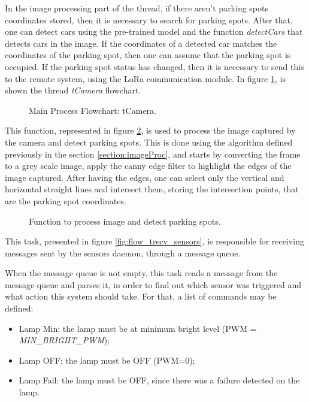 In the image processing part of the thread, if there aren't parking spots coordinates stored, then it is necessary to search for parking spots. After that, one can detect cars using the pre-trained model and the function \textit{detectCars} that detects cars in the image. If the coordinates of a detected car matches the coordinates of the parking spot, then one can assume that the parking spot is occupied. If the parking spot status has changed, then it is necessary to send this to the remote system, using the LoRa communication module. In figure \ref{fig:flow_tcamera}, is shown the thread \textit{tCamera} flowchart.

\begin{figure}[H]
	\centering			
	\caption{Main Process Flowchart: tCamera.}
	\label{fig:flow_tcamera}
\end{figure}


This function, represented in figure \ref{fig:search}, is used to process the image captured by the camera and detect parking spots. This is done using the algorithm defined previously in the section \ref{section:imageProc}, and starts by converting the frame to a grey scale image, apply the canny edge filter to highlight the edges of the image captured. After having the edges, one can select only the vertical and horizontal straight lines and intersect them, storing the intersection points, that are the parking spot coordinates.

\begin{figure}[H]
	\centering			
	\caption{Function to process image and detect parking spots.}
	\label{fig:search}
\end{figure}



This task, presented in figure \ref{fig:flow_trecv_sensors}, is responsible for receiving messages sent by the sensors daemon, through a message queue.

When the message queue is not empty, this task reads a message from the message queue and parses it, in order to find out which sensor was triggered and what action this system should take. For that, a list of commands may be defined:
\begin{itemize}
	\item Lamp Min: the lamp must be at minimum bright level (PWM = \textit{MIN\_BRIGHT\_PWM});
	\item Lamp OFF: the lamp must be OFF (PWM=0);
	\item Lamp Fail: the lamp must be OFF, since there was a failure detected on the lamp.
\end{itemize}

